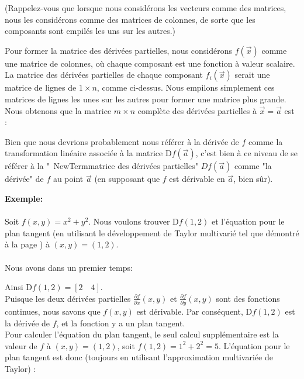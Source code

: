 	(Rappelez-vous que lorsque nous considérons les vecteurs comme des matrices, nous les considérons comme des matrices de colonnes, de sorte que les composants sont empilés les uns sur les autres.)
	
	Pour former la matrice des dérivées partielles, nous considérons $f(\vec{x})$ comme une matrice de colonnes, où chaque composant est une fonction à valeur scalaire. La matrice des dérivées partielles de chaque composant $f_{i}(\vec{x})$ serait une matrice de lignes de $1 \times n$, comme ci-dessus. Nous empilons simplement ces matrices de lignes les unes sur les autres pour former une matrice plus grande. Nous obtenons que la matrice $m \times n$ complète des dérivées partielles à $\vec{x}=\vec{a}$ est :
	
	Bien que nous devrions probablement nous référer à la dérivée de $f$ comme la transformation linéaire associée à la matrice $\mathrm{D}f(\vec{a})$, c'est bien à ce niveau de se référer à la "\ NewTerm{matrice des dérivées partielles}" $Df(\vec{a})$ comme "la dérivée" de $f$ au point $\vec{a}$ (en supposant que $f$ est dérivable en $\vec{ a}$, bien sûr).
	
	\begin{tcolorbox}[colframe=black,colback=white,sharp corners]
	\textbf{{\Large {}}Exemple:}\\\\
	Soit $f(x, y)=x^{2}+y^{2}$. Nous voulons trouver $\mathrm{D} f(1,2)$ et l'équation pour le plan tangent (en utilisant le développement de Taylor multivarié tel que démontré à la page \pageref{multivariate taylor series}) à $(x, y)=(1,2)$.\\\\
		
	Nous avons dans un premier temps:
	
	Ainsi $\mathrm{D} f(1,2)=\left[2\quad 4\right]$.\\
	
	Puisque les deux dérivées partielles $\frac{\partial f}{\partial x}(x, y)$ et $\frac{\partial f}{\partial y}(x, y)$ sont des fonctions continues, nous savons que $f(x, y)$ est dérivable. Par conséquent, $\mathrm{D}f(1,2)$ est la dérivée de $f$, et la fonction y a un plan tangent.\\
	
	Pour calculer l'équation du plan tangent, le seul calcul supplémentaire est la valeur de $f$ à $(x, y)=(1,2)$, soit $f(1,2)=1^{2} +2^{2}=5$. L'équation pour le plan tangent est donc (toujours en utilisant l'approximation multivariée de Taylor) :
	
	\end{tcolorbox}

